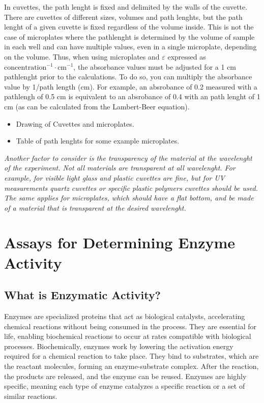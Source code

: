 \documentclass[
  9pt,
  american,
  a5paper,
  extrafontsizes,onecolumn,openright
  ]{memoir}
\providecommand{\tightlist}{%
  \setlength{\itemsep}{0pt}\setlength{\parskip}{0pt}}
\begin{document}
In cuvettes, the path lenght is fixed and delimited by the walls of the cuvette. There are cuvettes of different sizes, volumes and path lenghts, but the path lenght of a given cuvette is fixed regardless of the volume inside. This is not the case of microplates where the pathlenght is determined by the volume of sample in each well and can have multiple values, even in a single microplate, depending on the volume. Thus, when using microplates and \(\varepsilon\) expressed as \(\text{concentration}^{-1} \cdot \text{cm}^{-1}\), the absorbance values must be adjusted for a 1 cm pathlenght prior to the calculations. To do so, you can multiply the absorbance value by 1/path length (cm). For example, an absrobance of 0.2 measured with a pathlengh of 0.5 cm is equivalent to an absrobance of 0.4 with an path lenght of 1 cm (as can be calculated from the Lambert-Beer equation).

\begin{itemize}
\tightlist
\item
  Drawing of Cuvettes and microplates.
\item
  Table of path lenghts for some example microplates.
\end{itemize}

\begin{greybox}[frametitle = Note]
\emph{Another factor to consider is the transparency of the material at the wavelenght of the experiment. Not all materials are transparent at all wavelenght. For example, for visible light glass and plastic cuvettes are fine, but for UV measurements quartz cuvettes or specific plastic polymers cuvettes should be used. The same applies for microplates, which should have a flat bottom, and be made of a material that is transparent at the desired wavelenght.}

\end{greybox}

\chapter{Assays for Determining Enzyme Activity}\label{chapter3}

\section{What is Enzymatic Activity?}\label{what-is-enzymatic-activity}

Enzymes are specialized proteins that act as biological catalysts, accelerating chemical reactions without being consumed in the process. They are essential for life, enabling biochemical reactions to occur at rates compatible with biological processes. Biochemically, enzymes work by lowering the activation energy required for a chemical reaction to take place. They bind to substrates, which are the reactant molecules, forming an enzyme-substrate complex. After the reaction, the products are released, and the enzyme can be reused. Enzymes are highly specific, meaning each type of enzyme catalyzes a specific reaction or a set of similar reactions.
\end{document}
